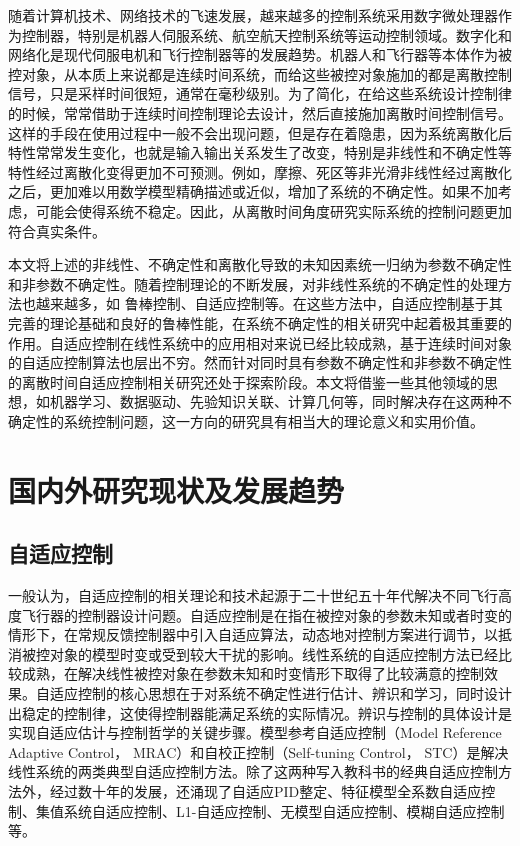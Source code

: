 随着计算机技术、网络技术的飞速发展，越来越多的控制系统采用数字微处理器作为控制器，特别是机器人伺服系统、航空航天控制系统等运动控制领域。数字化和网络化是现代伺服电机和飞行控制器等的发展趋势。机器人和飞行器等本体作为被控对象，从本质上来说都是连续时间系统，而给这些被控对象施加的都是离散控制信号，只是采样时间很短，通常在毫秒级别。为了简化，在给这些系统设计控制律的时候，常常借助于连续时间控制理论去设计，然后直接施加离散时间控制信号。这样的手段在使用过程中一般不会出现问题，但是存在着隐患，因为系统离散化后特性常常发生变化，也就是输入输出关系发生了改变，特别是非线性和不确定性等特性经过离散化变得更加不可预测。例如，摩擦、死区等非光滑非线性经过离散化之后，更加难以用数学模型精确描述或近似，增加了系统的不确定性。如果不加考虑，可能会使得系统不稳定。因此，从离散时间角度研究实际系统的控制问题更加符合真实条件。

本文将上述的非线性、不确定性和离散化导致的未知因素统一归纳为参数不确定性和非参数不确定性。随着控制理论的不断发展，对非线性系统的不确定性的处理方法也越来越多，如 鲁棒控制、自适应控制等。在这些方法中，自适应控制基于其完善的理论基础和良好的鲁棒性能，在系统不确定性的相关研究中起着极其重要的作用。自适应控制在线性系统中的应用相对来说已经比较成熟，基于连续时间对象的自适应控制算法也层出不穷。然而针对同时具有参数不确定性和非参数不确定性的离散时间自适应控制相关研究还处于探索阶段。本文将借鉴一些其他领域的思想，如机器学习、数据驱动、先验知识关联、计算几何等，同时解决存在这两种不确定性的系统控制问题，这一方向的研究具有相当大的理论意义和实用价值。

\section{国内外研究现状及发展趋势}

\subsection{自适应控制}

一般认为，自适应控制的相关理论和技术起源于二十世纪五十年代解决不同飞行高度飞行器的控制器设计问题。自适应控制是在指在被控对象的参数未知或者时变的情形下，在常规反馈控制器中引入自适应算法，动态地对控制方案进行调节，以抵消被控对象的模型时变或受到较大干扰的影响。线性系统的自适应控制方法已经比较成熟，在解决线性被控对象在参数未知和时变情形下取得了比较满意的控制效果。自适应控制的核心思想在于对系统不确定性进行估计、辨识和学习，同时设计出稳定的控制律，这使得控制器能满足系统的实际情况。辨识与控制的具体设计是实现自适应估计与控制哲学的关键步骤。模型参考自适应控制（Model Reference Adaptive Control， MRAC）和自校正控制（Self-tuning Control， STC）是解决线性系统的两类典型自适应控制方法。除了这两种写入教科书的经典自适应控制方法外，经过数十年的发展，还涌现了自适应PID整定、特征模型全系数自适应控制、集值系统自适应控制、L1-自适应控制、无模型自适应控制、模糊自适应控制等。

